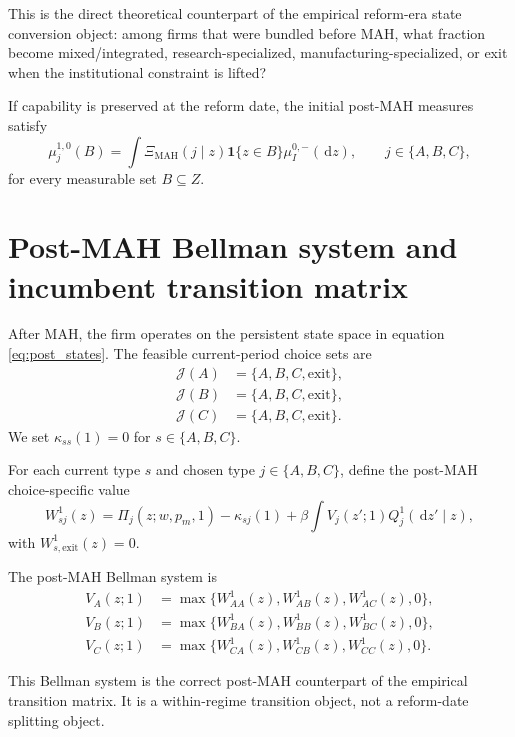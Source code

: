 \documentclass[12pt]{article}
\newcommand{\1}{\mathbf{1}}
\newcommand{\dd}{\,\mathrm{d}}
\begin{document}
This is the direct theoretical counterpart of the empirical reform-era state conversion object: among firms that were bundled before MAH, what fraction become mixed/integrated, research-specialized, manufacturing-specialized, or exit when the institutional constraint is lifted?

If capability is preserved at the reform date, the initial post-MAH measures satisfy
\begin{equation}
\mu_j^{1,0}(B)=\int \Xi_{\mathrm{MAH}}(j\mid z)\1\{z\in B\}\mu_I^{0,-}(\dd z),
\qquad j\in\{A,B,C\},
\label{eq:initial_post_dist}
\end{equation}
for every measurable set $B\subseteq Z$.

\section{Post-MAH Bellman system and incumbent transition matrix}

After MAH, the firm operates on the persistent state space in equation \eqref{eq:post_states}. The feasible current-period choice sets are
\begin{align}
\mathcal J(A)&=\{A,B,C,\mathrm{exit}\},\\
\mathcal J(B)&=\{A,B,C,\mathrm{exit}\},\\
\mathcal J(C)&=\{A,B,C,\mathrm{exit}\}.
\end{align}
We set $\kappa_{ss}(1)=0$ for $s\in\{A,B,C\}$.

For each current type $s$ and chosen type $j\in\{A,B,C\}$, define the post-MAH choice-specific value
\begin{equation}
W_{sj}^1(z)=\Pi_j(z;w,p_m,1)-\kappa_{sj}(1)+\beta\int V_j(z';1)Q_j^1(\dd z'\mid z),
\label{eq:choice_specific_post}
\end{equation}
with $W_{s,\mathrm{exit}}^1(z)=0$.

The post-MAH Bellman system is
\begin{align}
V_A(z;1) &= \max\bigl\{W_{AA}^1(z),W_{AB}^1(z),W_{AC}^1(z),0\bigr\}, \label{eq:VA}\\
V_B(z;1) &= \max\bigl\{W_{BA}^1(z),W_{BB}^1(z),W_{BC}^1(z),0\bigr\}, \label{eq:VB}\\
V_C(z;1) &= \max\bigl\{W_{CA}^1(z),W_{CB}^1(z),W_{CC}^1(z),0\bigr\}. \label{eq:VC}
\end{align}

This Bellman system is the correct post-MAH counterpart of the empirical transition matrix. It is a within-regime transition object, not a reform-date splitting object.
\end{document}
